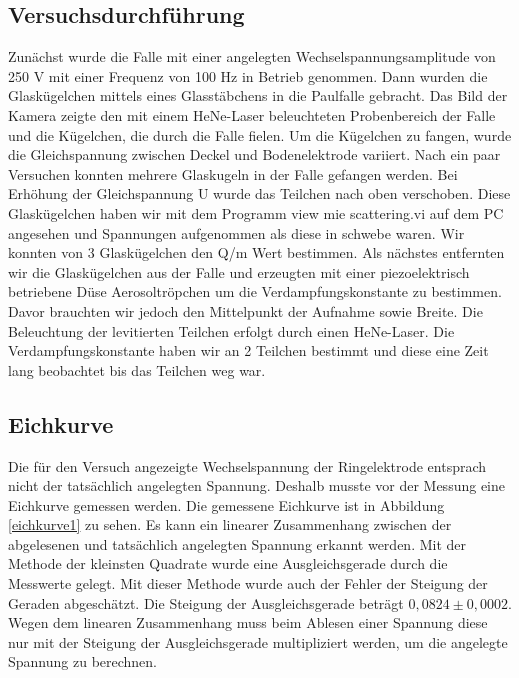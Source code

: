 \documentclass[10pt,a4paper]{article}
\begin{document}
\subsection{Versuchsdurchführung}
Zunächst wurde die Falle mit einer angelegten Wechselspannungsamplitude von 250 V mit
einer Frequenz von 100 Hz in Betrieb genommen. Dann wurden die Glaskügelchen mittels
eines Glasstäbchens in die Paulfalle gebracht. Das Bild der Kamera zeigte den mit
einem HeNe-Laser beleuchteten Probenbereich der Falle und die Kügelchen, die durch die
Falle fielen. Um die Kügelchen zu fangen, wurde die Gleichspannung zwischen Deckel und
Bodenelektrode variiert.
Nach ein paar Versuchen konnten mehrere Glaskugeln in der Falle gefangen werden.
Bei Erhöhung der Gleichspannung U wurde das Teilchen nach oben verschoben. Diese Glaskügelchen haben wir mit dem Programm view mie scattering.vi auf dem PC angesehen und Spannungen aufgenommen als diese in schwebe waren. Wir konnten von 3 Glaskügelchen den Q/m Wert bestimmen. Als nächstes entfernten wir die Glaskügelchen aus der Falle und erzeugten mit einer piezoelektrisch betriebene Düse Aerosoltröpchen um die Verdampfungskonstante zu bestimmen. Davor brauchten wir jedoch den Mittelpunkt der Aufnahme sowie Breite. Die Beleuchtung der levitierten Teilchen erfolgt durch einen HeNe-Laser. Die Verdampfungskonstante haben wir an 2 Teilchen bestimmt und diese eine Zeit lang beobachtet bis das Teilchen weg war.


\subsection{Eichkurve}

Die für den Versuch angezeigte Wechselspannung der Ringelektrode entsprach nicht der tatsächlich angelegten Spannung. Deshalb musste vor der Messung eine Eichkurve gemessen werden. Die gemessene Eichkurve ist in Abbildung \ref{eichkurve1} zu sehen. Es kann ein linearer Zusammenhang zwischen der abgelesenen und tatsächlich angelegten Spannung erkannt werden. Mit der Methode der kleinsten Quadrate wurde eine Ausgleichsgerade durch die Messwerte gelegt. Mit dieser Methode wurde auch der Fehler der Steigung der Geraden abgeschätzt. Die Steigung der Ausgleichsgerade beträgt $0,0824 \pm 0,0002$. Wegen dem linearen Zusammenhang muss beim Ablesen einer Spannung diese nur mit der Steigung der Ausgleichsgerade multipliziert werden, um die angelegte Spannung zu berechnen.
\end{document}

